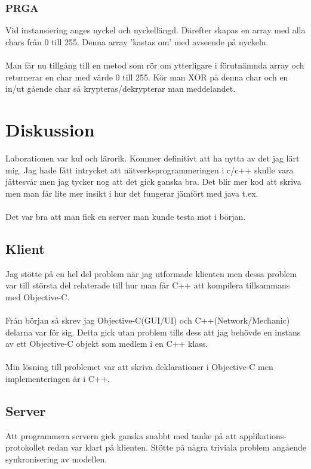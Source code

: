 \documentclass[10pt, titlepage, oneside, a4paper]{article}
\begin{document}
		\subsubsection{PRGA} 
		Vid instansiering anges nyckel och nyckellängd. Därefter skapas en array med alla chars från 0 till 255. Denna array 'kastas om' med avseende på nyckeln.\\\\Man får nu tillgång till en metod som rör om ytterligare i förutnämnda array och returnerar en char med värde 0 till 255. Kör man XOR på denna char och en in/ut gående char så krypteras/dekrypterar man meddelandet.
		
	\newpage
	\section{Diskussion}%
	Laborationen var kul och lärorik. Kommer definitivt att ha nytta av det jag lärt mig. Jag hade fått intrycket att nätverksprogrammeringen i c/c++ skulle vara jättesvår men jag tycker nog att det gick ganska bra. Det blir mer kod att skriva men man får lite mer insikt i hur det fungerar jämfört med java t.ex.\\\\Det var bra att man fick en server man kunde testa mot i början. 
	
	\subsection{Klient}
	Jag stötte på en hel del problem när jag utformade klienten men dessa problem var till största del relaterade till hur man får C++ att kompilera tillsammans med Objective-C.\\\\Från början så skrev jag Objective-C(GUI/UI) och C++(Network/Mechanic) delarna var för sig. Detta gick utan problem tills dess att jag behövde en instans av ett Objective-C objekt som medlem i en C++ klass.\\\\Min lösning till problemet var att skriva deklarationer i Objective-C men implementeringen är i C++.
	
	\subsection{Server}
	Att programmera servern gick ganska snabbt med tanke på att applikations-protokollet redan var klart på klienten. Stötte på några triviala problem angående synkronisering av modellen.
  
    
\end{document}

